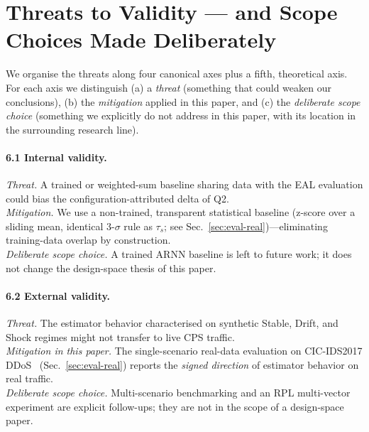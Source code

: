 \documentclass[futureinternet,article,submit,pdftex,moreauthors]{Definitions/mdpi}
\newcommand{\taus}{\ensuremath{\tau_{s}}}
\begin{document}
\section{Threats to Validity --- and Scope Choices Made Deliberately}
\label{sec:tov}

We organise the threats along four canonical axes plus a fifth,
theoretical axis. For each axis we distinguish (a) a \emph{threat}
(something that could weaken our conclusions), (b) the \emph{mitigation}
applied in this paper, and (c) the \emph{deliberate scope choice}
(something we explicitly do not address in this paper, with its location
in the surrounding research line).

\paragraph{6.1 Internal validity.}
\emph{Threat.} A trained or weighted-sum baseline sharing data with the
EAL evaluation could bias the configuration-attributed delta of Q2.\\
\emph{Mitigation.} We use a non-trained, transparent statistical
baseline (z-score over a sliding mean, identical 3-$\sigma$ rule as
$\taus$; see Sec.~\ref{sec:eval-real})---eliminating training-data
overlap by construction.\\
\emph{Deliberate scope choice.} A trained ARNN baseline is left to
future work; it does not change the design-space thesis of this paper.

\paragraph{6.2 External validity.}
\emph{Threat.} The estimator behavior characterised on synthetic Stable,
Drift, and Shock regimes might not transfer to live CPS traffic.\\
\emph{Mitigation in this paper.} The single-scenario real-data
evaluation on CIC-IDS2017 DDoS~\cite{cicids2017}
(Sec.~\ref{sec:eval-real}) reports the \emph{signed direction} of
estimator behavior on real traffic.\\
\emph{Deliberate scope choice.} Multi-scenario benchmarking and an RPL
multi-vector experiment are explicit follow-ups; they are not in the
scope of a design-space paper.
\end{document}
